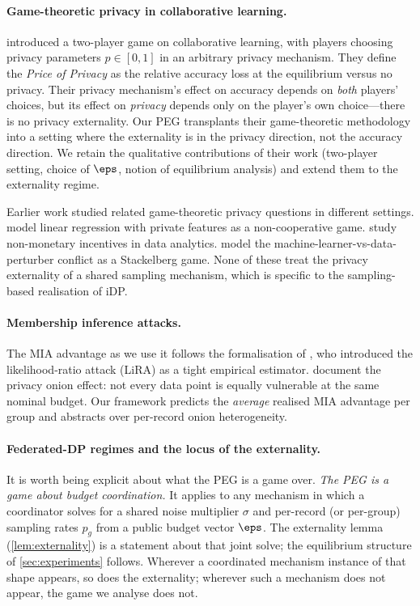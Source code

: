 \paragraph{Game-theoretic privacy in collaborative learning.}
\citet{pejo2019together} introduced a two-player game on collaborative
learning, with players choosing privacy parameters $p \in [0, 1]$ in an
arbitrary privacy mechanism. They define the \emph{Price of Privacy} as the
relative accuracy loss at the equilibrium versus no privacy. Their
privacy mechanism's effect on accuracy depends on \emph{both} players'
choices, but its effect on \emph{privacy} depends only on the player's own
choice---there is no privacy externality. Our PEG transplants their
game-theoretic methodology into a setting where the externality is in the
privacy direction, not the accuracy direction. We retain the qualitative
contributions of their work (two-player setting, choice of $\eps$,
notion of equilibrium analysis) and extend them to the externality regime.

Earlier work studied related game-theoretic privacy questions in different
settings. \citet{ioannidis2013linear} model linear regression with private
features as a non-cooperative game. \citet{chessa2015game} study non-monetary
incentives in data analytics. \citet{pawlick2016stackelberg} model the
machine-learner-vs-data-perturber conflict as a Stackelberg game. None of
these treat the privacy externality of a shared sampling mechanism, which is
specific to the sampling-based realisation of iDP.

\paragraph{Membership inference attacks.}
The MIA advantage as we use it follows the formalisation of
\citet{carlini2022membership}, who introduced the likelihood-ratio attack
(LiRA) as a tight empirical estimator. \citet{carlini2022privacy} document
the privacy onion effect: not every data point is equally vulnerable at
the same nominal budget. Our framework predicts the \emph{average} realised
MIA advantage per group and abstracts over per-record onion heterogeneity.

\paragraph{Federated-DP regimes and the locus of the externality.}
It is worth being explicit about what the PEG is a game over.
\emph{The PEG is a game about budget coordination.} It applies to any
mechanism in which a coordinator solves for a shared noise multiplier
$\sigma$ and per-record (or per-group) sampling rates $p_g$ from a
public budget vector $\boldsymbol{\eps}$. The externality lemma
(\cref{lem:externality}) is a statement about that joint solve; the
equilibrium structure of \cref{sec:experiments} follows. Wherever a
coordinated mechanism instance of that shape appears, so does the
externality; wherever such a mechanism does not appear, the game we
analyse does not.

